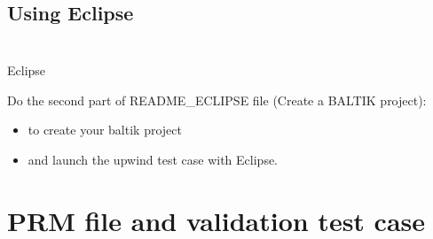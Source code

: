 \documentclass[10pt, hyperref={unicode=true,pdfusetitle, bookmarks=true,bookmarksnumbered=false,bookmarksopen=false, breaklinks=false,pdfborder={0 0 1},backref=true,colorlinks=true,linkcolor=darkblue,pageanchor, urlcolor=darkblue}]{beamer}
\begin{document}
\subsection{{\bf{Using Eclipse}}}
\begin{frame}
\begin{columns}[c] 
\tableofcontents[sections={1-3},currentsection, currentsubsection]
\tableofcontents[sections={4-8},currentsection, currentsubsection]
\end{columns}
\end{frame}
\begin{frame}
\frametitle{}
\begin{block}{Eclipse}

Do the second part of README\_ECLIPSE file (Create a BALTIK project):
\begin{itemize}
\item to create your baltik project
\item and launch the upwind test case with Eclipse.
\end{itemize}

\end{block}
\end{frame}



\section{{\bf{PRM file and validation test case}}}
\end{document}
